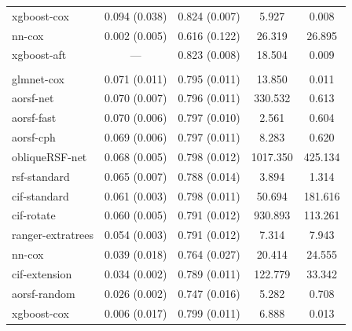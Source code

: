 \documentclass[twoside,11pt]{article}\usepackage[]{graphicx}\usepackage[]{xcolor}
\newenvironment{knitrout}{}{} %
\begin{document}
\begin{knitrout}
\begin{longtable}[t]{lcccc}
\hspace{1em}xgboost-cox & 0.094 (0.038) & 0.824 (0.007) & 5.927 & 0.008\\
\hspace{1em}nn-cox & 0.002 (0.005) & 0.616 (0.122) & 26.319 & 26.895\\
\hspace{1em}xgboost-aft & --- & 0.823 (0.008) & 18.504 & 0.009\\
\addlinespace[0.3em]
\multicolumn{5}{l}{\textit{\textbf{SPRINT; CVD death, n = 9361, p = 174}}}\\
\hline
\hspace{1em}glmnet-cox & 0.071 (0.011) & 0.795 (0.011) & 13.850 & 0.011\\
\hspace{1em}aorsf-net & 0.070 (0.007) & 0.796 (0.011) & 330.532 & 0.613\\
\hspace{1em}aorsf-fast & 0.070 (0.006) & 0.797 (0.010) & 2.561 & 0.604\\
\hspace{1em}aorsf-cph & 0.069 (0.006) & 0.797 (0.011) & 8.283 & 0.620\\
\hspace{1em}obliqueRSF-net & 0.068 (0.005) & 0.798 (0.012) & 1017.350 & 425.134\\
\hspace{1em}rsf-standard & 0.065 (0.007) & 0.788 (0.014) & 3.894 & 1.314\\
\hspace{1em}cif-standard & 0.061 (0.003) & 0.798 (0.011) & 50.694 & 181.616\\
\hspace{1em}cif-rotate & 0.060 (0.005) & 0.791 (0.012) & 930.893 & 113.261\\
\hspace{1em}ranger-extratrees & 0.054 (0.003) & 0.791 (0.012) & 7.314 & 7.943\\
\hspace{1em}nn-cox & 0.039 (0.018) & 0.764 (0.027) & 20.414 & 24.555\\
\hspace{1em}cif-extension & 0.034 (0.002) & 0.789 (0.011) & 122.779 & 33.342\\
\hspace{1em}aorsf-random & 0.026 (0.002) & 0.747 (0.016) & 5.282 & 0.708\\
\hspace{1em}xgboost-cox & 0.006 (0.017) & 0.799 (0.011) & 6.888 & 0.013\\

\end{longtable}
\end{knitrout}
\end{document}
